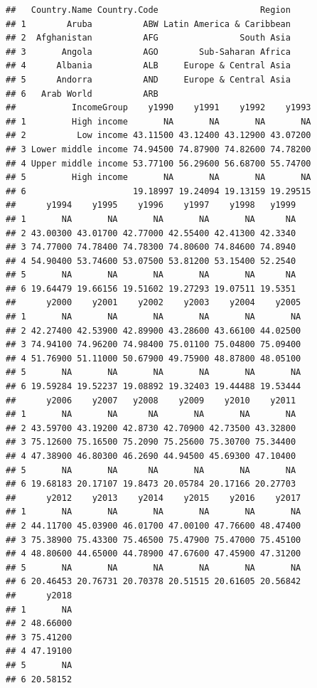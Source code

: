 \documentclass[
]{book}
\begin{document}
\begin{verbatim}
##   Country.Name Country.Code                    Region
## 1        Aruba          ABW Latin America & Caribbean
## 2  Afghanistan          AFG                South Asia
## 3       Angola          AGO        Sub-Saharan Africa
## 4      Albania          ALB     Europe & Central Asia
## 5      Andorra          AND     Europe & Central Asia
## 6   Arab World          ARB                          
##           IncomeGroup    y1990    y1991    y1992    y1993
## 1         High income       NA       NA       NA       NA
## 2          Low income 43.11500 43.12400 43.12900 43.07200
## 3 Lower middle income 74.94500 74.87900 74.82600 74.78200
## 4 Upper middle income 53.77100 56.29600 56.68700 55.74700
## 5         High income       NA       NA       NA       NA
## 6                     19.18997 19.24094 19.13159 19.29515
##      y1994    y1995    y1996    y1997    y1998   y1999
## 1       NA       NA       NA       NA       NA      NA
## 2 43.00300 43.01700 42.77000 42.55400 42.41300 42.3340
## 3 74.77000 74.78400 74.78300 74.80600 74.84600 74.8940
## 4 54.90400 53.74600 53.07500 53.81200 53.15400 52.2540
## 5       NA       NA       NA       NA       NA      NA
## 6 19.64479 19.66156 19.51602 19.27293 19.07511 19.5351
##      y2000    y2001    y2002    y2003    y2004    y2005
## 1       NA       NA       NA       NA       NA       NA
## 2 42.27400 42.53900 42.89900 43.28600 43.66100 44.02500
## 3 74.94100 74.96200 74.98400 75.01100 75.04800 75.09400
## 4 51.76900 51.11000 50.67900 49.75900 48.87800 48.05100
## 5       NA       NA       NA       NA       NA       NA
## 6 19.59284 19.52237 19.08892 19.32403 19.44488 19.53444
##      y2006    y2007   y2008    y2009    y2010    y2011
## 1       NA       NA      NA       NA       NA       NA
## 2 43.59700 43.19200 42.8730 42.70900 42.73500 43.32800
## 3 75.12600 75.16500 75.2090 75.25600 75.30700 75.34400
## 4 47.38900 46.80300 46.2690 44.94500 45.69300 47.10400
## 5       NA       NA      NA       NA       NA       NA
## 6 19.68183 20.17107 19.8473 20.05784 20.17166 20.27703
##      y2012    y2013    y2014    y2015    y2016    y2017
## 1       NA       NA       NA       NA       NA       NA
## 2 44.11700 45.03900 46.01700 47.00100 47.76600 48.47400
## 3 75.38900 75.43300 75.46500 75.47900 75.47000 75.45100
## 4 48.80600 44.65000 44.78900 47.67600 47.45900 47.31200
## 5       NA       NA       NA       NA       NA       NA
## 6 20.46453 20.76731 20.70378 20.51515 20.61605 20.56842
##      y2018
## 1       NA
## 2 48.66000
## 3 75.41200
## 4 47.19100
## 5       NA
## 6 20.58152
\end{verbatim}
\end{document}
